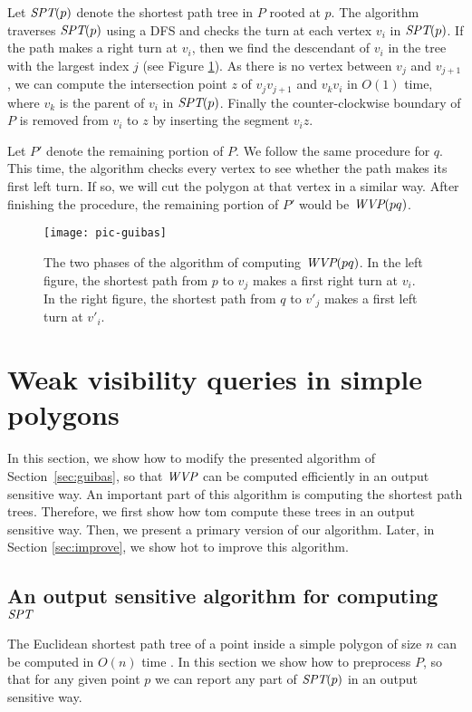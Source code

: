 \documentclass[5p]{elsarticle}
\def\WVP{\mbox{\it{WVP}}}
\def\SPT{\mbox{\it{SPT}}}
\def\P{\mbox{${P}$}}
\begin{document}
Let $\SPT(p)$ denote the shortest path tree in $\P$ rooted at $p$. 
The algorithm traverses $\SPT(p)$ using a DFS and checks the turn at each vertex
$v_i$ in $\SPT(p)$. If the path makes a right turn at $v_i$, then 
we find the descendant of $v_i$ in the tree with the largest index $j$ (see Figure \ref{fig:guibas}).
As there is no vertex between $v_j$ and $v_{j+1}$,
we can compute the intersection point $z$ of $v_jv_{j+1}$ and $v_kv_i$ 
in $O(1)$ time, where $v_k$ is the
parent of $v_i$ in $\SPT(p)$.
Finally the counter-clockwise boundary 
of $\P$ is removed from $v_i$ to $z$ by inserting the segment $v_iz$.

Let $\P'$ denote the remaining portion of $\P$. We follow the same procedure for
$q$. This time, the algorithm checks every vertex to see whether the path 
makes its first left turn. If so, we will cut the polygon at that vertex in a similar way. 
After finishing the procedure, 
the remaining portion of $\P'$ would be $\WVP(pq)$.


\begin{figure}[h]
  \centering
  \texttt{[image: pic-guibas]} 
  \caption{ The two phases of the algorithm of computing $\WVP(pq)$.
	In the left figure, the shortest path from $p$ to $v_j$ makes a first right turn at $v_i$. In 
	the right figure, the shortest path from $q$ to $v'_j$ makes a first left turn at $v'_i$.}
  \label{fig:guibas}
\end{figure}



\section{Weak visibility queries in simple polygons} \label{sec:first-alg}
In this section, we show how to modify the presented algorithm of Section~\ref{sec:guibas}, 
so that $\WVP$ can be computed efficiently in an output sensitive way.
An important part of this algorithm is computing the shortest path trees. Therefore,
we first show how tom compute these trees in an output sensitive way. Then,
we present a primary version of our algorithm. 
Later, in Section \ref{sec:improve}, we show hot to improve this algorithm.

\subsection{An output sensitive algorithm for computing $\SPT$} \label{sec:spt}
The Euclidean shortest path tree of a point inside a simple polygon of size $n$ 
can be computed in $O(n)$ time \cite{guibas}.
In this section we show how to preprocess $\P$, so that
for any given point $p$ we can report any part of $\SPT(p)$ 
in an output sensitive way.
\end{document}
